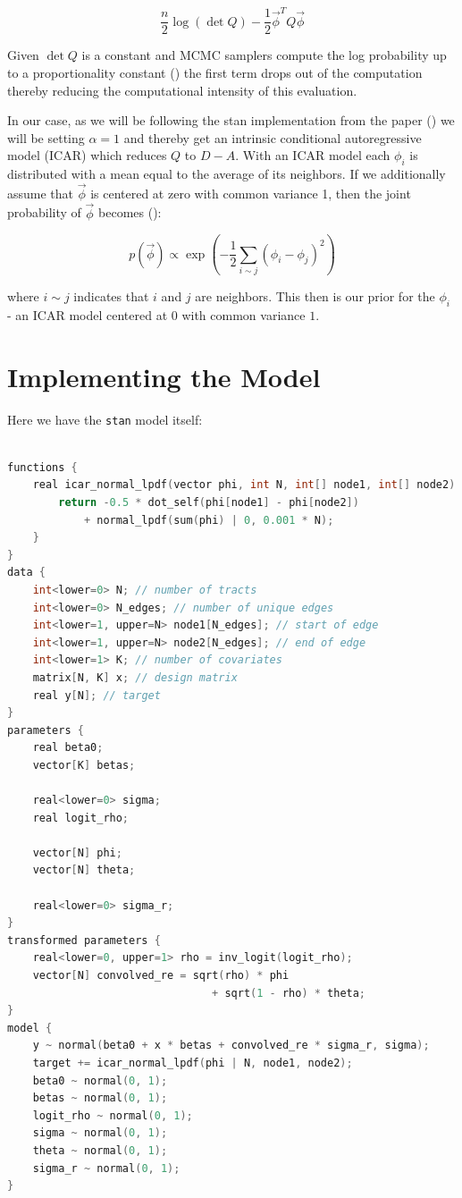 \documentclass[11pt]{article}
\newcommand{\code}[1]{\colorbox{light-gray}{\texttt{#1}}}
\begin{document}
$$\frac{n}{2}\log{(\det{Q})}-\frac{1}{2}\vec{\phi}^T Q \vec{\phi}$$

Given $\det{Q}$ is a constant and MCMC samplers compute the log probability up to a proportionality constant (\cite{bymstan}) the first term drops out of the computation thereby reducing the computational intensity of this evaluation. 

In our case, as we will be following the stan implementation from the paper (\cite{bymstan}) we will be setting $\alpha=1$ and thereby get an intrinsic conditional autoregressive model (ICAR) which reduces $Q$ to $D-A$. With an ICAR model each $\phi_i$ is distributed with a mean equal to the average of its neighbors. If we additionally assume that $\vec{\phi}$ is centered at zero with common variance 1, then the joint probability of $\vec{\phi}$ becomes (\cite{bymstan}):

$$p(\vec{\phi})\propto \exp{\left( -\frac{1}{2} \sum_{i\sim j} (\phi_i - \phi_j)^2 \right)}$$

where $i \sim j$ indicates that $i$ and $j$ are neighbors. This then is our prior for the $\phi_i$ - an ICAR model centered at $0$ with common variance $1$. 

\section{Implementing the Model}

Here we have the \code{stan} model itself:

\begin{lstlisting}[language=C++, basicstyle=\small]

functions {
    real icar_normal_lpdf(vector phi, int N, int[] node1, int[] node2) {
        return -0.5 * dot_self(phi[node1] - phi[node2]) 
            + normal_lpdf(sum(phi) | 0, 0.001 * N);
    }
}
data {
    int<lower=0> N; // number of tracts
    int<lower=0> N_edges; // number of unique edges
    int<lower=1, upper=N> node1[N_edges]; // start of edge
    int<lower=1, upper=N> node2[N_edges]; // end of edge
    int<lower=1> K; // number of covariates
    matrix[N, K] x; // design matrix
    real y[N]; // target
}
parameters {
    real beta0;
    vector[K] betas;

    real<lower=0> sigma;
    real logit_rho;

    vector[N] phi;
    vector[N] theta;

    real<lower=0> sigma_r;
}
transformed parameters {
    real<lower=0, upper=1> rho = inv_logit(logit_rho);
    vector[N] convolved_re = sqrt(rho) * phi 
                                + sqrt(1 - rho) * theta;
}
model {
    y ~ normal(beta0 + x * betas + convolved_re * sigma_r, sigma);
    target += icar_normal_lpdf(phi | N, node1, node2);
    beta0 ~ normal(0, 1);
    betas ~ normal(0, 1);
    logit_rho ~ normal(0, 1);
    sigma ~ normal(0, 1);
    theta ~ normal(0, 1);
    sigma_r ~ normal(0, 1);
}

\end{lstlisting}
\end{document}
